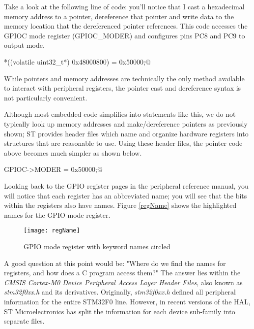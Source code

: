 \documentclass[11pt,fleqn]{book} %
\makeatletter
\newcommand{\ilcode}[1]{
    \begin{center} \parskip=-15pt \colorbox{gray!20!white}{
        \parbox{\columnwidth-2\fboxsep}{
            \lstinline@#1@
        }
    } \end{center}
}
\makeatother
\begin{document}
Take a look at the following line of code: you'll notice that I cast a hexadecimal memory address to a pointer, dereference that pointer and write data to the memory location that the dereferenced pointer references. This code accesses the GPIOC mode register (GPIOC\_MODER) and configures pins PC8 and PC9 to output mode.

\ilcode{*((volatile uint32\_t*) 0x48000800) = 0x50000;}%
\smallskip

While pointers and memory addresses are technically the only method available to interact with peripheral registers, the pointer cast and dereference syntax is not particularly convenient.

Although most embedded code simplifies into statements like this, we do not typically look up memory addresses and make/dereference pointers as previously shown; ST provides header files which name and organize hardware registers into structures that are reasonable to use. Using these header files, the pointer code above becomes much simpler as shown below.

\ilcode{GPIOC->MODER = 0x50000;}%
\smallskip


Looking back to the GPIO register pages in the peripheral reference manual, you will notice that each register has an abbreviated name; you will see that the bits within the registers also have names. Figure \vref{regName} shows the highlighted names for the GPIO mode register. 

\begin{figure}[]
    \centering\texttt{[image: regName]}
    \caption{GPIO mode register with keyword names circled}
    \label{regName}
\end{figure}

A good question at this point would be: "Where do we find the names for registers, and how does a C program access them?" The answer lies within the \textit{CMSIS Cortex-M0 Device Peripheral Access Layer Header Files}, also known as \textit{stm32f0xx.h} and its derivatives. Originally, \textit{stm32f0xx.h} defined all peripheral information for the entire STM32F0 line. However, in recent versions of the HAL, ST Microelectronics has split the information for each device sub-family into separate files. 
\end{document}
